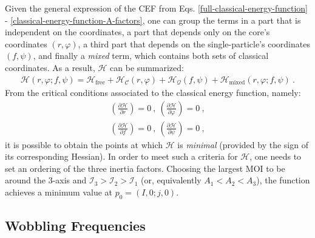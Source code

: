Given the general expression of the CEF from Eqs. \ref{full-classical-energy-function} - \ref{classical-energy-function-A-factors}, one can group the terms in a part that is independent on the coordinates, a part that depends only on the core's coordinates $(r,\varphi)$, a third part that depends on the single-particle's coordinates $(f,\psi)$, and finally a \emph{mixed} term, which contains both sets of classical coordinates. As a result, $\mathcal{H}$ can be summarized:
\begin{align}
    \mathcal{H}(r,\varphi;f,\psi)=\mathcal{H}_\text{free}+\mathcal{H}_\mathscr{C}(r,\varphi)+\mathcal{H}_\mathcal{Q}(f,\psi)+\mathcal{H}_\text{mixed}(r,\varphi;f,\psi)\ .
    \label{classical-energy-function-terms}
\end{align}
From the critical conditions associated to the classical energy function, namely:
\begin{gather*}
    \left(\frac{\partial \mathcal{H}}{\partial r}\right)=0\ ,\ \left(\frac{\partial \mathcal{H}}{\partial \varphi}\right)=0\ ,\\
    \left(\frac{\partial \mathcal{H}}{\partial f}\right)=0\ ,\ \left(\frac{\partial \mathcal{H}}{\partial \psi}\right)=0\ ,
\end{gather*}
it is possible to obtain the points at which $\mathcal{H}$ is \emph{minimal} (provided by the sign of its corresponding Hessian). In order to meet such a criteria for $\mathcal{H}$, one needs to set an ordering of the three inertia factors. Choosing the largest MOI to be around the $3$-axis and $\mathcal{I}_3>\mathcal{I}_2>\mathcal{I}_1$ (or, equivalently $A_1<A_2<A_3$), the function achieves a minimum value at $p_0=(I,0;j,0)$.

\subsection{Wobbling Frequencies}

